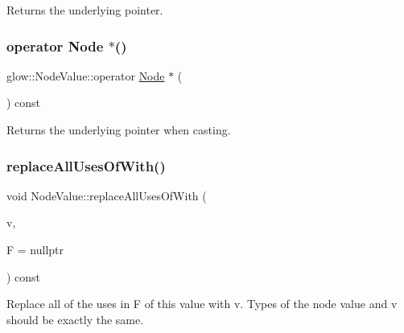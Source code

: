 \begin{DoxyReturn}{Returns}
the underlying pointer. 
\end{DoxyReturn}
\mbox{\label{structglow_1_1_node_value_a6c13650fac87ad2bde4d217b89b67cd0}} 
\subsubsection{\texorpdfstring{operator Node $\ast$()}{operator Node *()}}
{\footnotesize\ttfamily glow\+::\+Node\+Value\+::operator \hyperlink{classglow_1_1_node}{Node} $\ast$ (\begin{DoxyParamCaption}{ }\end{DoxyParamCaption}) const\hspace{0.3cm}{\ttfamily [inline]}}

\begin{DoxyReturn}{Returns}
the underlying pointer when casting. 
\end{DoxyReturn}
\mbox{\label{structglow_1_1_node_value_a9817ddc27b8f7ce8627a3427bb93cc4c}} 
\subsubsection{\texorpdfstring{replace\+All\+Uses\+Of\+With()}{replaceAllUsesOfWith()}}
{\footnotesize\ttfamily void Node\+Value\+::replace\+All\+Uses\+Of\+With (\begin{DoxyParamCaption}\item[{\hyperlink{structglow_1_1_node_value}{Node\+Value}}]{v,  }\item[{const \hyperlink{classglow_1_1_function}{Function} $\ast$}]{F = {\ttfamily nullptr} }\end{DoxyParamCaption}) const}

Replace all of the uses in {\ttfamily F} of this value with {\ttfamily v}. Types of the node value and {\ttfamily v} should be exactly the same. \mbox{\label{structglow_1_1_node_value_a189050953f05aa071d0ea42e0c96ca1d}} 
